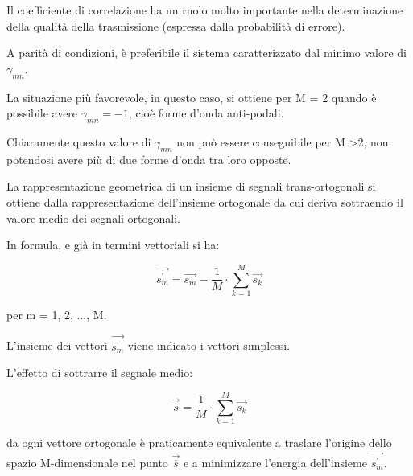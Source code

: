 Il coefficiente di correlazione ha un ruolo molto importante nella determinazione della qualità della trasmissione (espressa dalla probabilità di errore). \newline 

A parità di condizioni, è preferibile il sistema caratterizzato dal minimo valore di $\gamma_{mn}$. \newline 

La situazione più favorevole, in questo caso, si ottiene per M = 2 quando è possibile avere $\gamma_{mn} = -1 $, 
cioè forme d'onda anti-podali. \newline 

Chiaramente questo valore di $\gamma_{mn}$ non può essere conseguibile per M \textgreater 2, 
non potendosi avere più di due forme d'onda tra loro opposte. \newline 

La rappresentazione geometrica di un insieme di segnali trans-ortogonali si ottiene dalla rappresentazione dell'insieme ortogonale da cui deriva sottraendo il valore medio dei segnali ortogonali. \newline 

In formula, e già in termini vettoriali si ha: 

{
    \Large 
    \begin{equation}
            \overrightarrow{s_m^{'}}
            = 
            \overrightarrow{s_m}
            - 
            \frac{1}{M}
            \cdot 
            \sum_{k = 1}^{M}
            \overrightarrow{s_k}
        \end{equation}
}

per m = 1, 2, $\dots$, M. \newline 

L'insieme dei vettori $\overrightarrow{s_m^{'}}$ viene indicato i vettori simplessi. \newline 

L'effetto di sottrarre il segnale medio: 

{
    \Large 
    \begin{equation}
        \overrightarrow{\overline{s}}
        = 
        \frac{1}{M} \cdot \sum_{k = 1}^{M} \overrightarrow{s_k}
    \end{equation}
}

da ogni vettore ortogonale è praticamente equivalente a traslare l'origine dello spazio M-dimensionale 
nel punto $\overrightarrow{\overline{s}}$ e a minimizzare l'energia dell'insieme ${\overrightarrow{s_m^{'}}}$. \newline 

